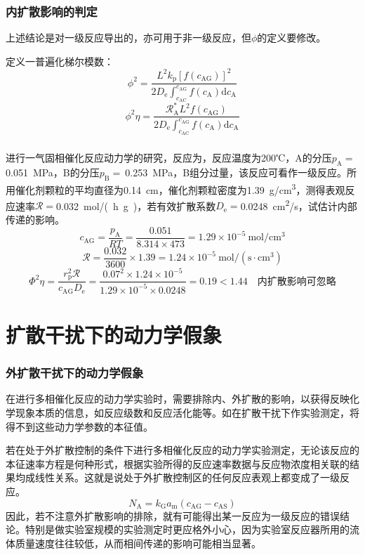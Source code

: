 \documentclass[dvipsnames, svgnames, x11names]{beamer}
\begin{document}
\begin{frame}
    \frametitle{内扩散影响的判定}

    上述结论是对一级反应导出的，亦可用于非一级反应，但$\phi$的定义要修改。
    
    定义一普遍化梯尔模数：
    \[
        \phi^{2}=\frac{L^{2} k_{\mathrm{p}}\left[f(c_{\mathrm{AG}})\right]^{2}}{2 D_{\mathrm{e}} \int_{c_{\mathrm{AC}}}^{c_{\mathrm{AG}}} f(c_{\mathrm{A}}) \mathrm{d} c_{\mathrm{A}}}
    \]
    \[
        \phi^{2} \eta=\frac{\mathscr{R}_{\mathrm{A}}^{*} L^{2} f(c_{\mathrm{AG}})}{2 D_{\mathrm{e}} \int_{c_{\mathrm{AC}}}^{c_{\mathrm{AG}}} f(c_{\mathrm{A}}) \mathrm{d} c_{\mathrm{A}}}
    \]

\end{frame}


\begin{frame}[t]
    \frametitle{}
    \begin{example}
        进行一气固相催化反应动力学的研究，反应为，反应温度为200℃，A的分压$p_\mathrm{A} =\ $\SI{0.051}{MPa}，B的分压$p_\mathrm{B} =\ $\SI{0.253}{MPa}，B组分过量，该反应可看作一级反应。所用催化剂颗粒的平均直径为\SI{0.14}{cm}，催化剂颗粒密度为\SI{1.39}{g/cm^3}，测得表观反应速率$\mathscr{R} =$\SI{0.032}{mol/(h.g)}，若有效扩散系数$D_\mathrm{e} =$\SI{0.0248}{cm^2/s}，试估计内部传递的影响。
        \tcblower
    \pause
    \[
        c_{\mathrm{AG}}=\frac{p_{\mathrm{A}}}{R T}=\frac{0.051}{8.314 \times 473}=1.29 \times 10^{-5} \mathrm{~mol} / \mathrm{cm}^{3}
    \]
    \[
        \mathscr{R}=\frac{0.032}{3600} \times 1.39=1.24 \times 10^{-5} \mathrm{~mol} /(\mathrm{s} \cdot \mathrm{cm}^{3})
    \]
    \[
        \Phi^{2} \eta= \frac{r_{\mathrm{p}}^{2}\mathscr{R}}{c_{\mathrm{AG}} D_{\mathrm{e}}}= \frac{0.07^{2}\times 1.24 \times 10^{-5}}{1.29 \times 10^{-5} \times 0.0248}=0.19<1.44 \quad \text{内扩散影响可忽略}
    \]
    \end{example}
\end{frame}


\section{扩散干扰下的动力学假象}

\begin{frame}
    \frametitle{外扩散干扰下的动力学假象}

    在进行多相催化反应的动力学实验时，需要排除内、外扩散的影响，以获得反映化学现象本质的信息，如反应级数和反应活化能等。如在扩散干扰下作实验测定，将得不到这些动力学参数的本征值。

    若在处于外扩散控制的条件下进行多相催化反应的动力学实验测定，无论该反应的本征速率方程是何种形式，根据实验所得的反应速率数据与反应物浓度相关联的结果均成线性关系。这就是说处于外扩散控制区的任何反应表观上都变成了一级反应。    
    \[
        N_\mathrm{A} = k_\mathrm{G}a_\mathrm{m}(c_\mathrm{AG} - c_\mathrm{AS})
    \]
    因此，若不注意外扩散影响的排除，就有可能得出某一反应为一级反应的错误结论。特别是做实验室规模的实验测定时更应格外小心，因为实验室反应器所用的流体质量速度往往较低，从而相间传递的影响可能相当显著。

\end{frame}
\end{document}
